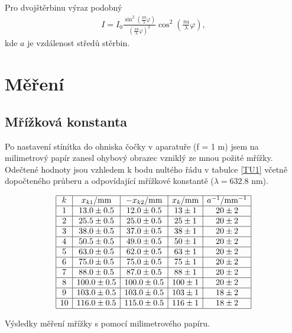 \documentclass[a4paper,12pt]{article}
\begin{document}
Pro dvojštěrbinu výraz podobný
\begin{eqnarray}
I=I_0\frac{\sin^2(\frac{\pi b}{\lambda}\varphi)}{(\frac{\pi b}{\lambda}\varphi)^2}\cos^2\left(\frac{\pi a}{\lambda}\varphi\right),
\label{DSt}
\end{eqnarray}
kde $a$ je vzdálenost středů stěrbin.

\section{Měření}
\subsection{Mřížková konstanta}
Po nastavení stínítka do ohniska čočky v aparatuře (f = 1 m) jsem na milimetrový papír zanesl ohybový obrazec vzniklý ze mnou požité mřížky. 
Odečtené hodnoty jsou vzhledem k bodu nultého řádu v tabulce \ref{TU1} včetně dopočteného průberu a odpovídající mřížkové konstantě ($\lambda = 632.8$ nm).

\begin{table}
$$
\begin{array}{|c|c|c|c|c|}
\hline
k&  x_{k1}/\mbox{mm}&  -x_{k2}/\mbox{mm}&   x_k/\mbox{mm}& a^{-1}/\mbox{mm}^{-1}  \\ \hline
1&  13.0 \pm 0.5 & 12.0 \pm 0.5&    13 \pm 1&   20\pm 2 \\ \hline
2&  25.5  \pm 0.5  & 25.0\pm 0.5&   25\pm 1&    20\pm 2 \\ \hline
3&  38.0 \pm 0.5&    37.0\pm 0.5&   38\pm 1&    20\pm 2 \\ \hline
4&  50.5 \pm 0.5&  49.0\pm 0.5& 50\pm 1&    20\pm 2 \\ \hline
5&  63.0 \pm 0.5&  62.0\pm 0.5& 63\pm 1&    20\pm 2 \\ \hline
6&  75.0 \pm 0.5&  75.0\pm 0.5& 75\pm 1&    20\pm 2 \\ \hline
7&  88.0 \pm 0.5&  87.0\pm 0.5& 88\pm 1&    20\pm 2 \\ \hline
8&  100.0 \pm 0.5& 100.0\pm 0.5&    100\pm 1&   20\pm 2 \\ \hline
9&  103.0 \pm 0.5& 103.0\pm 0.5&    103\pm 1&   18\pm 2 \\ \hline
10& 116.0\pm 0.5&  115.0\pm 0.5&    116\pm 1&   18\pm 2 \\ \hline
\end{array}
$$
\caption{Výsledky měření mřížky s pomocí milimetrového papíru.}
\label{TU1}
\end{table}
\end{document}

